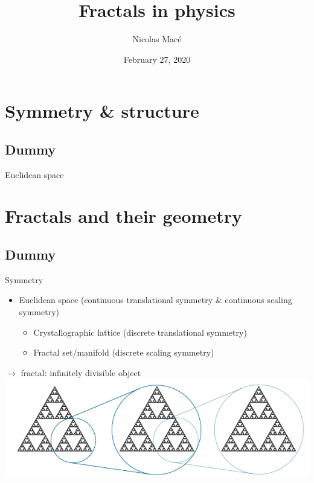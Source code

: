 \documentclass[xcolor=x11names,compress,professionalfonts]{beamer}
\renewcommand{\(}{\begin{columns}}
\renewcommand{\)}{\end{columns}}
\newcommand{\<}[1]{\begin{column}{#1}}
\renewcommand{\>}{\end{column}}
\begin{document}
\begin{frame}
\title{Fractals in physics}
\author{ Nicolas Macé }
\date{
	February 27, 2020
}
\titlepage
\end{frame}

\section{Symmetry \& structure}
\subsection{Dummy}

\begin{frame}{Euclidean space}
\end{frame}

\section{Fractals and their geometry}
\subsection{Dummy}

\begin{frame}{Symmetry}
    \begin{itemize}
        \item Euclidean space (continuous translational symmetry \& continuous scaling symmetry)
            \begin{itemize}
                \item Crystallographic lattice (discrete translational symmetry)
                \item Fractal set/manifold (discrete scaling symmetry)
            \end{itemize}
    \end{itemize}
    
    $\rightarrow$ fractal: infinitely divisible object
    \includegraphics[scale=1.00]{sierpinski.pdf}
\end{frame}
\end{document}
